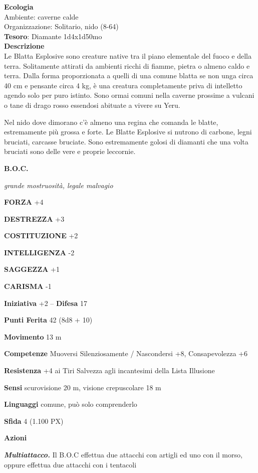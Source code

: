 \begin{multicols}{2}
	\textbf{Ecologia}\\
	Ambiente: caverne calde\\
	Organizzazione: Solitario, nido (8-64)\\
	\textbf{Tesoro}: Diamante 1d4x1d50mo\\
	\textbf{Descrizione}\\
	Le Blatta Esplosive sono creature native tra il piano elementale del fuoco e della terra. Solitamente attirati da ambienti ricchi di fiamme, pietra o almeno caldo e terra.
	Dalla forma proporzionata a quelli di una comune blatta se non unga circa 40 cm e pensante circa 4 kg, è una creatura completamente priva di intelletto agendo solo per puro istinto.
	Sono ormai comuni nella caverne prossime a vulcani o tane di drago rosso essendosi abituate a vivere su Yeru.

	Nel nido dove dimorano c'è almeno una regina che comanda le blatte, estremamente più grossa e forte. Le Blatte Esplosive si nutrono di carbone, legni bruciati, carcasse bruciate. Sono estremamente golosi di diamanti che una volta bruciati sono delle vere e proprie leccornie.

	\medskip{}\textbf{B.O.C.}

	\textit{grande mostruosità, legale malvagio}

	\textbf{FORZA} +4

	\textbf{DESTREZZA} +3

	\textbf{COSTITUZIONE} +2

	\textbf{INTELLIGENZA} -2

	\textbf{SAGGEZZA} +1

	\textbf{CARISMA} -1

	\textbf{Iniziativa} +2 -- \textbf{Difesa} 17

	\textbf{Punti Ferita} 42 (8d8 + 10)

	\textbf{Movimento} 13 m

	\textbf{Competenze} Muoversi Silenziosamente / Nascondersi +8, Consapevolezza +6

	\textbf{Resistenza} +4 ai Tiri Salvezza agli incantesimi della Lista Illusione

	\textbf{Sensi} scurovisione 20 m, visione crepuscolare 18 m

	\textbf{Linguaggi} comune, può solo comprenderlo

	\textbf{Sfida} 4 (1.100 PX)

	\textbf{Azioni}

	\textit{\textbf{Multiattacco.}} Il B.O.C effettua due attacchi con artigli ed uno con il morso, oppure effettua due attacchi con i tentacoli


\end{multicols}
